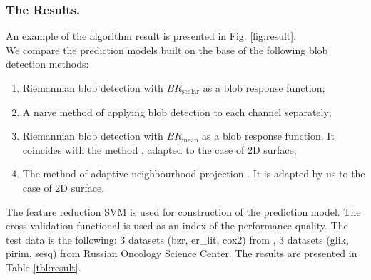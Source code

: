\documentclass{llncs}
\newcommand{\FRScalar}{BR_{\mathrm{scalar}}}
\newcommand{\FRMean}{BR_{\mathrm{mean}}}
\begin{document}
	\subsubsection{The Results.}
An example of the algorithm result is presented in Fig. \ref{fig:result}.
\\
We compare the prediction models built on the base of the following blob detection methods: 
\begin{enumerate}
\item	Riemannian blob detection with $\FRScalar$ as a blob response function;
\item	A naïve method of applying blob detection to each channel separately;
\item	Riemannian blob detection with $\FRMean$ as a blob response function. It coincides with the method \cite{ColorBlob}, adapted to the case of 2D surface;
\item	The method of adaptive neighbourhood projection \cite{GROM}. It is adapted by us to the case of 2D surface.
\end{enumerate}
The feature reduction SVM \cite{SVM} is used for construction of the prediction model. The cross-validation functional \cite{cross} is used as an index of the performance quality. The test data is the following: 3 datasets (bzr, er\_lit, cox2) from \cite{kernel}, 3 datasets (glik, pirim, sesq) from Russian Oncology Science Center. The results are presented in Table \ref{tbl:result}.
\end{document}
